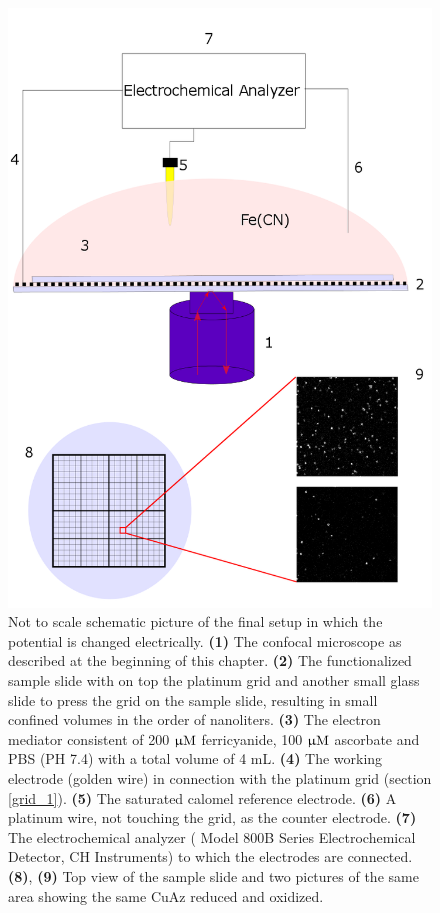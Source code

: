 \documentclass[twoside,single]{lion-msc}
\begin{document}
\begin{figure}[ht!]
\centering
\includegraphics[width=.75 \textwidth]{final_setup}
\caption{Not to scale schematic picture of the final setup in which the potential is changed electrically. \textbf{(1)} The confocal microscope as described at the beginning of this chapter. \textbf{(2)} The functionalized sample slide with on top the platinum grid and another small glass slide to press the grid on the sample slide, resulting in small confined volumes in the order of nanoliters. \textbf{(3)} The electron mediator consistent of 200 $\upmu \textup{M}$ ferricyanide, 100 $\upmu \textup{M}$ ascorbate and PBS (PH 7.4) with a total volume of 4 mL. \textbf{(4)} The working electrode (golden wire) in connection with the platinum grid (section \ref{grid_1}). \textbf{(5)} The saturated calomel reference electrode. \textbf{(6)} A platinum wire, not touching the grid, as the counter electrode. \textbf{(7)} The electrochemical analyzer ( Model 800B Series Electrochemical Detector, CH Instruments) to which the electrodes are connected. \textbf{(8)}, \textbf{(9)} Top view of the sample slide and two pictures of the same area showing the same CuAz reduced and oxidized.}
\label{final_setup}
\end{figure}
\end{document}
